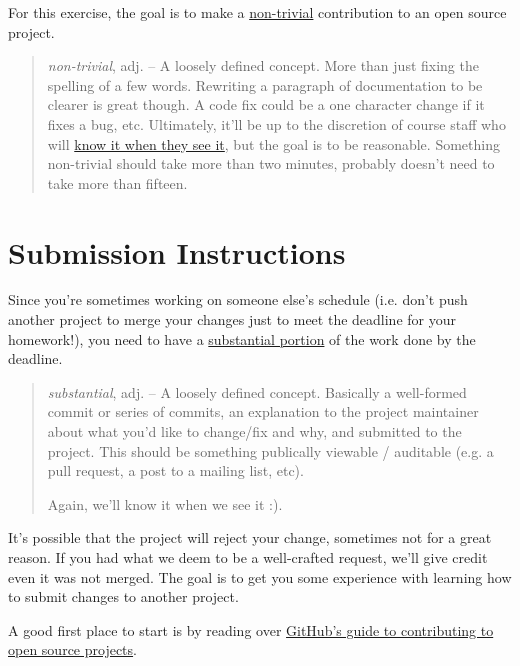 \documentclass{article}
\begin{document}
For this exercise, the goal is to make a \ul{non-trivial} contribution to an
open source project.

\begin{quote}
  \emph{non-trivial}, adj. -- A loosely defined concept. More than just fixing
  the spelling of a few words. Rewriting a paragraph of documentation to be
  clearer is great though. A code fix could be a one character change if it
  fixes a bug, etc. Ultimately, it'll be up to the discretion of course staff
  who will \href{https://en.wikipedia.org/wiki/I_know_it_when_I_see_it} {know
    it when they see it}, but the goal is to be reasonable. Something
  non-trivial should take more than two minutes, probably doesn't need to take
  more than fifteen.
\end{quote}

\section*{Submission Instructions}

Since you're sometimes working on someone else's schedule (i.e. don't push
another project to merge your changes just to meet the deadline for your
homework!), you need to have a \ul{substantial portion} of the work done by
the deadline.

\begin{quote}
  \emph{substantial}, adj. -- A loosely defined concept. Basically a
  well-formed commit or series of commits, an explanation to the project
  maintainer about what you'd like to change/fix and why, and submitted to the
  project. This should be something publically viewable / auditable (e.g. a
  pull request, a post to a mailing list, etc).

  Again, we'll know it when we see it :).
\end{quote}

It's possible that the project will reject your change, sometimes not for a
great reason. If you had what we deem to be a well-crafted request, we'll give
credit even it was not merged. The goal is to get you some experience with
learning how to submit changes to another project.

\begin{mdframed}\centering
A good first place to start is by reading over
\href{https://guides.github.com/activities/contributing-to-open-source/#contributing}{GitHub's
  guide to contributing to open source projects}.
\end{mdframed}
\end{document}
